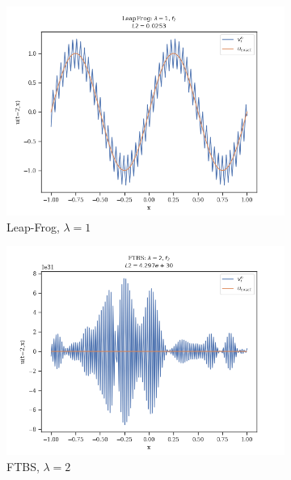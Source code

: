 \begin{figure}
\begin{subfigure}{0.3\linewidth}
        \includegraphics[width=\linewidth]{figures/LeapFrog/LeapFrog_lambda=1,f2}
        \caption{Leap-Frog, $\lambda =1$}
        \label{weird leap frog}
    \end{subfigure}
    \hfill
    \vspace{1cm}
    \begin{subfigure}{0.3\linewidth}
        \centering
        \includegraphics[width=\linewidth]{figures/FTBS/FTBS_lambda=2,f2}
        \caption{FTBS, $\lambda = 2$}
    \end{subfigure}
    \hfill
    \begin{subfigure}{0.3\linewidth}
        \centering

\end{subfigure}
\end{figure}
